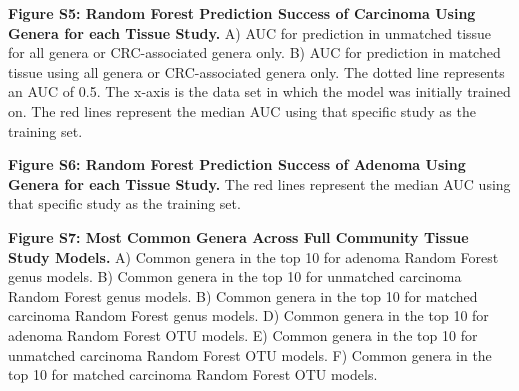 \documentclass[12pt,]{article}
\begin{document}
\textbf{Figure S5: Random Forest Prediction Success of Carcinoma Using
Genera for each Tissue Study.} A) AUC for prediction in unmatched tissue
for all genera or CRC-associated genera only. B) AUC for prediction in
matched tissue using all genera or CRC-associated genera only. The
dotted line represents an AUC of 0.5. The x-axis is the data set in
which the model was initially trained on. The red lines represent the
median AUC using that specific study as the training set.

\textbf{Figure S6: Random Forest Prediction Success of Adenoma Using
Genera for each Tissue Study.} The red lines represent the median AUC
using that specific study as the training set.

\textbf{Figure S7: Most Common Genera Across Full Community Tissue Study
Models.} A) Common genera in the top 10 for adenoma Random Forest genus
models. B) Common genera in the top 10 for unmatched carcinoma Random
Forest genus models. B) Common genera in the top 10 for matched
carcinoma Random Forest genus models. D) Common genera in the top 10 for
adenoma Random Forest OTU models. E) Common genera in the top 10 for
unmatched carcinoma Random Forest OTU models. F) Common genera in the
top 10 for matched carcinoma Random Forest OTU models.

\newpage
\end{document}
